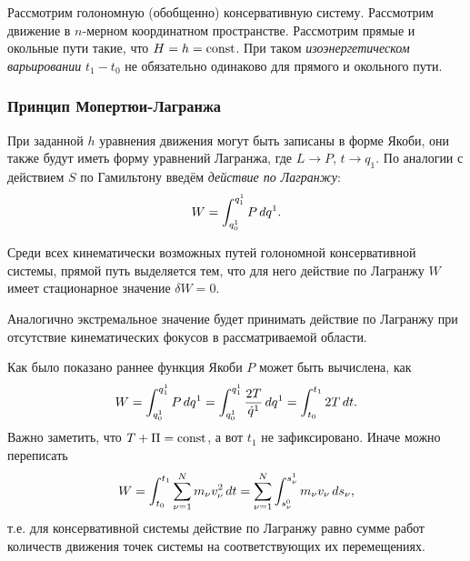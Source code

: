 \begin{to_def} 
    Рассмотрим голономную (обобщенно) консервативную систему. Рассмотрим движение в $n$-мерном координатном пространстве. Рассмотрим прямые и окольные пути такие, что $H = h = \text{const}$. При таком \textit{изоэнергетическом варьировании} $t_1-t_0$ не обязательно одинаково для прямого и окольного пути.     
\end{to_def}

\subsubsection*{Принцип Мопертюи-Лагранжа}

\begin{to_def} 
    При заданной $h$ уравнения движения могут быть записаны в форме Якоби, они также будут иметь форму уравнений Лагранжа, где $L \to P$, $t \to q_1$. По аналогии с действием $S$ по Гамильтону введём \textit{действие по Лагранжу}:
\begin{equation*}
    W = \int_{q_0^1}^{q_1^1} P \, d q^1.
\end{equation*} 
\end{to_def}


\begin{to_thr}
     Среди всех кинематически возможных путей голономной консервативной системы, прямой путь выделяется тем, что для него действие по Лагранжу $W$ имеет стационарное значение $\delta W = 0$.
\end{to_thr}

Аналогично экстремальное значение будет принимать действие по Лагранжу при отсутствие кинематических фокусов в рассматриваемой области. 

Как было показано раннее функция Якоби $P$ может быть вычислена, как
\begin{equation*}
    W = \int_{q_0^1}^{q_1^1} P \, d q^1 = \int_{q_0^1}^{q_1^1} \frac{2T}{\dot{q}^1} \, d q^1 = \int_{t_0}^{t_1} 2 T \, d t.
\end{equation*}
Важно заметить, что $T + \Pi = \text{const}$,  а вот $t_1$ не зафиксировано. Иначе можно переписать
\begin{equation*}
    W = \int_{t_0}^{t_1} \sum_{\nu=1}^N m_\nu v_\nu^2 \, d t 
    =
    \sum_{\nu=1}^N \int_{s_\nu^0}^{s_\nu^1} m_\nu v_\nu \, d s_\nu,
\end{equation*}
т.е. для консервативной системы действие по Лагранжу равно сумме работ количеств движения точек системы на соответствующих их перемещениях.















